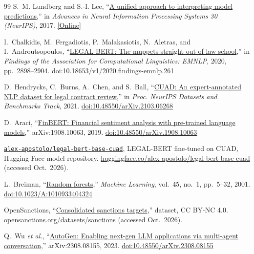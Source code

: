 \begin{thebibliography}{99}
S.~M. Lundberg and S.-I. Lee, ``\href{https://proceedings.neurips.cc/paper/2017/hash/8a20a8621978632d76c43dfd28b67767-Abstract.html}{A unified approach to interpreting model predictions},'' in \emph{Advances in Neural Information Processing Systems 30 (NeurIPS)}, 2017. \href{https://proceedings.neurips.cc/paper/2017/hash/8a20a8621978632d76c43dfd28b67767-Abstract.html}{[Online]}

I.~Chalkidis, M.~Fergadiotis, P.~Malakasiotis, N.~Aletras, and I.~Androutsopoulos, ``\href{https://doi.org/10.18653/v1/2020.findings-emnlp.261}{LEGAL-BERT: The muppets straight out of law school},'' in \emph{Findings of the Association for Computational Linguistics: EMNLP}, 2020, pp.~2898--2904. \href{https://doi.org/10.18653/v1/2020.findings-emnlp.261}{doi:10.18653/v1/2020.findings-emnlp.261}

D.~Hendrycks, C.~Burns, A.~Chen, and S.~Ball, ``\href{https://arxiv.org/abs/2103.06268}{CUAD: An expert-annotated NLP dataset for legal contract review},'' in \emph{Proc. NeurIPS Datasets and Benchmarks Track}, 2021. \href{https://doi.org/10.48550/arXiv.2103.06268}{doi:10.48550/arXiv.2103.06268}

D.~Araci, ``\href{https://arxiv.org/abs/1908.10063}{FinBERT: Financial sentiment analysis with pre-trained language models},'' arXiv:1908.10063, 2019. \href{https://doi.org/10.48550/arXiv.1908.10063}{doi:10.48550/arXiv.1908.10063}

\texttt{\href{https://huggingface.co/alex-apostolo/legal-bert-base-cuad}{alex-apostolo/legal-bert-base-cuad}}, LEGAL-BERT fine-tuned on CUAD, Hugging Face model repository. \href{https://huggingface.co/alex-apostolo/legal-bert-base-cuad}{huggingface.co/alex-apostolo/legal-bert-base-cuad} (accessed Oct.~2026).

L.~Breiman, ``\href{https://doi.org/10.1023/A:1010933404324}{Random forests},'' \emph{Machine Learning}, vol.~45, no.~1, pp.~5--32, 2001. \href{https://doi.org/10.1023/A:1010933404324}{doi:10.1023/A:1010933404324}

OpenSanctions, ``\href{https://www.opensanctions.org/datasets/sanctions/}{Consolidated sanctions targets},'' dataset, CC BY-NC 4.0. \href{https://www.opensanctions.org/datasets/sanctions/}{opensanctions.org/datasets/sanctions} (accessed Oct.~2026).

Q.~Wu \emph{et al.}, ``\href{https://arxiv.org/abs/2308.08155}{AutoGen: Enabling next-gen LLM applications via multi-agent conversation},'' arXiv:2308.08155, 2023. \href{https://doi.org/10.48550/arXiv.2308.08155}{doi:10.48550/arXiv.2308.08155}


\end{thebibliography}
